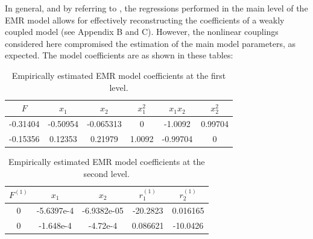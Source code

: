 \documentclass[12pt]{article}
\begin{document}
In general, and by referring to \cite{Kravtsov2005}, the regressions performed in the main level of the EMR model allows for effectively reconstructing the coefficients of a weakly coupled model (see Appendix B and C). However, the nonlinear couplings considered here compromised the estimation of the main model parameters, as expected. The model coefficients are as shown in these tables:

\begin{table}[H]
\centering
\caption{Empirically estimated EMR model coefficients at the first level.}
\begin{tabular}{cccccc}
	$F$ & $x_1$ & $x_2$ & $x_1^2$ & $x_1x_2$ & $x_2^2$ \\ 
	\hline 
	-0.31404 & -0.50954 & -0.065313 & 0 & -1.0092 & 0.99704 \\ 
	-0.15356 & 0.12353 & 0.21979 & 1.0092 & -0.99704 & 0 \\ 
	\hline 
\end{tabular}
\end{table}

\begin{table}[H]
	\centering
	\caption{Empirically estimated EMR model coefficients at the second level.}
\begin{tabular}{ccccc}
	$F^{(1)}$ & $x_1$ & $x_2$ & $r^{(1)}_1$ & $r^{(1)}_2$  \\ 
	\hline 
0 & -5.6397e-4 & -6.9382e-05 & -20.2823 & 0.016165  \\ 
0 & -1.648e-4 & -4.72e-4 & 0.086621 & -10.0426  \\ 
	\hline 
\end{tabular}
\end{table}
\end{document}
